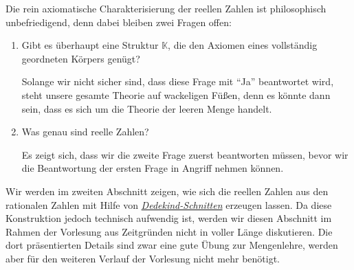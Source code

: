 Die rein axiomatische Charakterisierung der
reellen Zahlen ist philosophisch unbefriedigend, denn dabei bleiben zwei Fragen offen:
\begin{enumerate}
\item Gibt es überhaupt eine Struktur $\mathbb{K}$, die den Axiomen eines vollständig geordneten
      Körpers genügt?

      Solange wir nicht sicher sind, dass diese Frage mit ``Ja'' beantwortet wird, steht unsere
      gesamte Theorie auf wackeligen Füßen, denn es könnte dann sein, dass es sich um die Theorie
      der leeren Menge handelt. 
\item Was genau sind reelle Zahlen?

      Es zeigt sich, dass wir die zweite Frage zuerst beantworten müssen, bevor wir die Beantwortung
      der ersten Frage in Angriff nehmen können. 
\end{enumerate}
Wir werden im zweiten Abschnitt zeigen, wie sich die reellen Zahlen aus den rationalen Zahlen mit
Hilfe von \href{https://de.wikipedia.org/wiki/Dedekindscher_Schnitt}{\emph{Dedekind-Schnitten}}
erzeugen lassen.  Da diese Konstruktion jedoch technisch aufwendig ist, werden wir diesen Abschnitt
im Rahmen der Vorlesung aus Zeitgründen nicht in voller Länge diskutieren.  Die dort
präsentierten Details sind zwar eine gute Übung zur Mengenlehre,  werden aber für den weiteren
Verlauf der Vorlesung nicht mehr benötigt.


